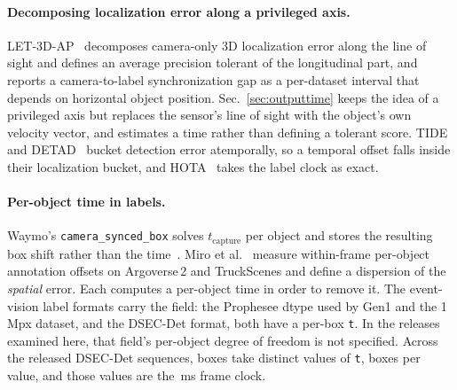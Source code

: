 \documentclass[10pt,twocolumn,letterpaper]{article}
\begin{document}
\paragraph{Decomposing localization error along a privileged axis.}
LET-3D-AP~\cite{hung2022let} decomposes camera-only 3D localization error along
the line of sight and defines an average precision tolerant of the longitudinal
part, and reports a camera-to-label synchronization gap as a per-dataset interval
that depends on horizontal object position. Sec.~\ref{sec:outputtime} keeps the
idea of a privileged axis but replaces the sensor's line of sight with the
object's own velocity vector, and estimates a time rather than defining a
tolerant score.
TIDE~\cite{bolya2020tide,hoiem2012diagnosing} and DETAD~\cite{alwassel2018detad}
bucket detection error atemporally, so a temporal offset falls inside their
localization bucket, and HOTA~\cite{luiten2021hota} takes the label clock as
exact.

\paragraph{Per-object time in labels.} Waymo's \texttt{camera\_synced\_box} solves
$t_{\mathrm{capture}}$ per object and stores the resulting box shift rather than
the time~\cite{waymolabelproto,sun2020waymo}. Miro et
al.~\cite{nunez2026annotations} measure within-frame per-object annotation
offsets on Argoverse\,2 and TruckScenes and define a dispersion of the
\emph{spatial} error. Each computes a per-object time in order to remove it. The
event-vision label formats carry the field: the Prophesee dtype used by Gen1 and
the 1\,Mpx dataset, and the DSEC-Det format, both have a per-box \texttt{t}. In the releases examined
here, that field's per-object degree of freedom is not specified. Across the \ddSeqs{} released DSEC-Det
sequences, \ddBoxes{} boxes take \ddDistinctT{} distinct values of \texttt{t},
\ddBoxesPerT{} boxes per value, and those values are the \dsecFramePeriod\,ms
frame clock.
\end{document}
